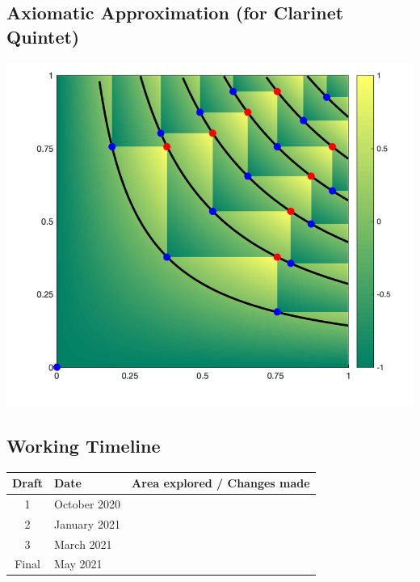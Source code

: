 \documentclass{article}
\begin{document}
\begin{center}
\vspace*{\fill}
\LARGE
    \section{Axiomatic Approximation (for Clarinet Quintet)}
    \includegraphics[width=\textwidth]{approximation.png}
\vspace*{\fill}
\end{center}

\newpage

\subsection{Working Timeline}
\begin{center}
	\def\arraystretch{1.5}
\begin{tabular}{|c|l|l|}
	\hline
	Draft&Date&Area explored / Changes made\\
	\hline
	1&October 2020&\\
	\hline
	2&January 2021&\\
	\hline
	3&March 2021&\\
	\hline
	Final&May 2021&\\
	\hline
\end{tabular}
\end{center}
\end{document}
